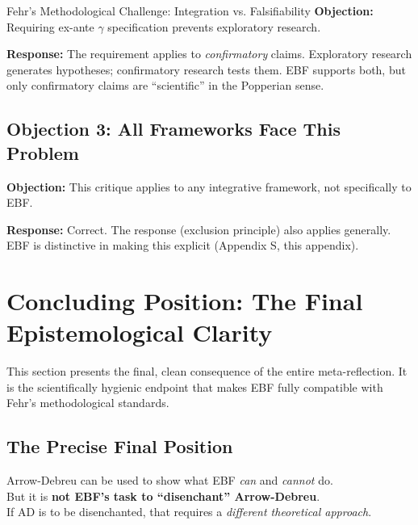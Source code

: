 \begin{chapter}{Fehr's Methodological Challenge: Integration vs. Falsifiability}
\textbf{Objection:} Requiring ex-ante $\gamma$ specification prevents exploratory research.

\textbf{Response:} The requirement applies to \textit{confirmatory} claims. Exploratory research generates hypotheses; confirmatory research tests them. EBF supports both, but only confirmatory claims are ``scientific'' in the Popperian sense.

\subsection{Objection 3: All Frameworks Face This Problem}

\textbf{Objection:} This critique applies to any integrative framework, not specifically to EBF.

\textbf{Response:} Correct. The response (exclusion principle) also applies generally. EBF is distinctive in making this explicit (Appendix S, this appendix).


\section{Concluding Position: The Final Epistemological Clarity}
\label{sec:conclusion}

This section presents the final, clean consequence of the entire meta-reflection.
It is the scientifically hygienic endpoint that makes EBF fully compatible with Fehr's
methodological standards.

\subsection{The Precise Final Position}

\begin{tcolorbox}[colback=blue!10!white,colframe=blue!75!black,title=\textbf{The Core Statement}]
\begin{center}
\large
Arrow-Debreu can be used to show what EBF \textit{can} and \textit{cannot} do.\\[0.5em]
But it is \textbf{not EBF's task to ``disenchant'' Arrow-Debreu}.\\[0.5em]
If AD is to be disenchanted, that requires a \textit{different theoretical approach}.
\end{center}
\end{tcolorbox}


\end{chapter}
